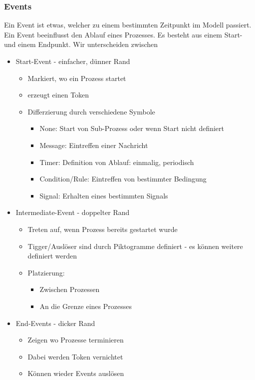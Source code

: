 \subsubsection{Events}
Ein Event ist etwas, welcher zu einem bestimmten Zeitpunkt im Modell passiert. Ein Event beeinflusst den Ablauf eines Prozesses. Es besteht aus einem Start- und einem Endpunkt.
Wir unterscheiden zwischen 
\begin{itemize}
    \item Start-Event - einfacher, dünner Rand
    \begin{itemize}
        \item Markiert, wo ein Prozess startet
        \item erzeugt einen Token
        \item Differzierung durch verschiedene Symbole
        \begin{itemize}
            \item None: Start von Sub-Prozess oder wenn Start nicht definiert
            \item Message: Eintreffen einer Nachricht
            \item Timer: Definition von Ablauf: einmalig, periodisch
            \item Condition/Rule: Eintreffen von bestimmter Bedingung 
            \item Signal: Erhalten eines bestimmten Signals
        \end{itemize}
    \end{itemize}
    \item Intermediate-Event - doppelter Rand
    \begin{itemize}
        \item Treten auf, wenn Prozess bereits gestartet wurde
        \item Tigger/Auslöser sind durch Piktogramme definiert - es können weitere definiert werden
        \item Platzierung:
        \begin{itemize}
            \item Zwischen Prozessen
            \item An die Grenze eines Prozesses
        \end{itemize}
    \end{itemize}
    \item End-Events - dicker Rand
    \begin{itemize}
        \item Zeigen wo Prozesse terminieren
        \item Dabei werden Token vernichtet
        \item Können wieder Events auslösen
    \end{itemize}
\end{itemize}
